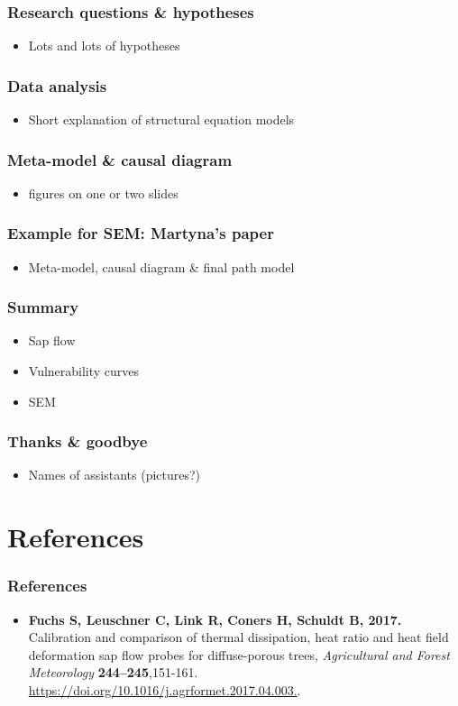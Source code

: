 \documentclass[usepdftitle=false]{beamer}
\begin{document}
\begin{frame}
	\frametitle{Research questions \& hypotheses}
	\begin{itemize}
		\item Lots and lots of hypotheses
	\end{itemize}
\end{frame}

\begin{frame}
	\frametitle{Data analysis}
	\begin{itemize}
		\item Short explanation of structural equation models		
	\end{itemize}
\end{frame}

\begin{frame}
	\frametitle{Meta-model \& causal diagram}
	\begin{itemize}
		\item figures on one or two slides		
	\end{itemize}
\end{frame}

\begin{frame}
	\frametitle{Example for SEM: Martyna's paper}
	\begin{itemize}
		\item Meta-model, causal diagram \& final path model	
	\end{itemize}
\end{frame}

\begin{frame}
	\frametitle{Summary}
	\begin{itemize}
		\item Sap flow
		\item Vulnerability curves
		\item SEM
	\end{itemize}
\end{frame}


\begin{frame}
	\frametitle{Thanks \& goodbye}
	\begin{itemize}
		\item Names of assistants (pictures?)
	\end{itemize}
\end{frame}

\section{References}
\begin{frame}
	\frametitle{References}
	\begin{itemize}
		\item \textbf{Fuchs S, Leuschner C, Link R, Coners H, Schuldt B, 2017.}
		Calibration and comparison of thermal dissipation, heat ratio and heat field deformation sap flow probes for diffuse-porous trees,
		\textit{Agricultural and Forest Meteorology} \textbf{244–245},151-161. \url{https://doi.org/10.1016/j.agrformet.2017.04.003.}.
	\end{itemize}
\end{frame}
\end{document}
